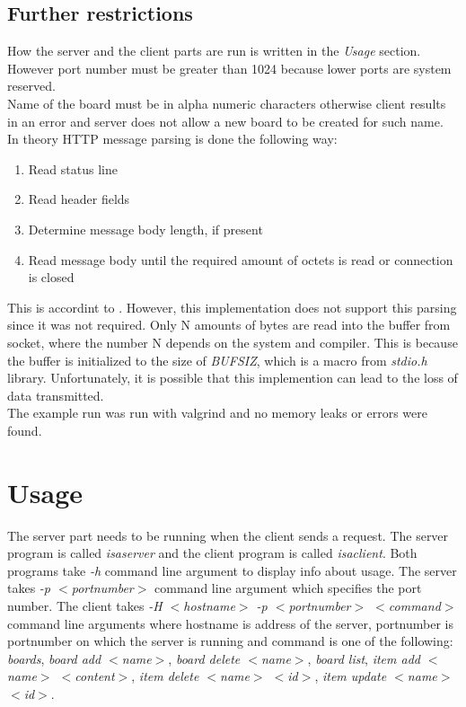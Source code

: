 \documentclass[11pt, a4paper]{article}
\begin{document}
	\subsection{Further restrictions}
	How the server and the client parts are run is written in the \textit{Usage} section. However port number must be greater than 1024 because lower ports are system reserved. \\
	Name of the board must be in alpha numeric characters otherwise client results in an error and server does not allow a new board to be created for such name. \\	
	In theory HTTP message parsing is done the following way:
	\begin{enumerate}
		\item Read status line
		\item Read header fields
		\item Determine message body length, if present
		\item Read message body until the required amount of octets is read or connection is closed
	\end{enumerate}
	This is accordint to \cite{Fiel:rfc7230}. However, this implementation does not support this parsing since it was not required. Only N amounts of bytes are read 		into the buffer from socket, where the number N depends on the system and compiler. This is because the buffer is initialized to the size of \textit{BUFSIZ}, 		which is a macro from \textit{stdio.h} library. Unfortunately, it is possible that this implemention can lead to the loss of data transmitted. \\
	The example run was run with valgrind and no memory leaks or errors were found.
		
	\newpage		
	\section{Usage}
	The server part needs to be running when the client sends a request. The server program is called \textit{isaserver} and the client program is called \textit{isaclient}. Both 		programs take \textit{-h} command line argument to display info about usage. The server takes \textit{-p $<$portnumber$>$} command line argument which specifies the port number. 	The client takes \textit{-H $<$hostname$>$ -p $<$portnumber$>$ $<$command$>$} command line arguments where hostname is address of the server, portnumber is portnumber on which the 		server is running and command is one of the following: \textit{boards}, \textit{board add $<$name$>$}, \textit{board delete $<$name$>$}, \textit{board list}, \textit{item add 		$<$name$>$ $<$content$>$}, \textit{item delete $<$name$>$ $<$id$>$}, \textit{item update $<$name$>$ $<$id$>$}.
\end{document}
